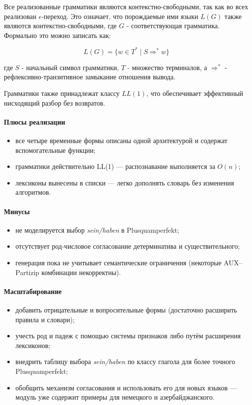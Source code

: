 \documentclass[areasetadvanced]{scrartcl}
\begin{document}
Все реализованные грамматики являются контекстно-свободными, так как во всех реализован $\epsilon$-переход. Это означает, что порождаемые ими языки $L(G)$ также являются контекстно-свободными, где $G$ - соответствующая грамматика. Формально это можно записать как:

\[
L(G) = \{w \in T^* \mid S \Rightarrow^* w\}
\]

где $S$ - начальный символ грамматики, $T$ - множество терминалов, а $\Rightarrow^*$ - рефлексивно-транзитивное замыкание отношения вывода.

Грамматики также принадлежат классу $LL(1)$, что обеспечивает эффективный нисходящий разбор без возвратов.


\paragraph*{Плюсы реализации}
\begin{itemize}
  \item все четыре временные формы описаны одной архитектурой и содержат вспомогательные функции;
  \item грамматики действительно LL(1) — распознавание выполняется за $O(n)$;
  \item лексиконы вынесены в списки — легко дополнять словарь без изменения алгоритмов.
\end{itemize}

\paragraph*{Минусы}
\begin{itemize}
  \item не моделируется выбор \textit{sein/haben} в Plusquamperfekt;
  \item отсутствует род‑числовое согласование детерминатива и существительного;
  \item генерация пока не учитывает семантические ограничения (некоторые AUX–Partizip комбинации некорректны).
\end{itemize}

\paragraph*{Масштабирование}
\begin{itemize}
  \item добавить отрицательные и вопросительные формы (достаточно расширить правила и словари);
  \item учесть род и падеж с помощью системы признаков либо путём расширения лексиконов;
  \item внедрить таблицу выбора \textit{sein/haben} по классу глагола для более точного
        Plusquamperfekt;
  \item обобщить механизм согласования и использовать его для новых языков — модуль уже содержит примеры для немецкого и азербайджанского.
\end{itemize}
\end{document}
